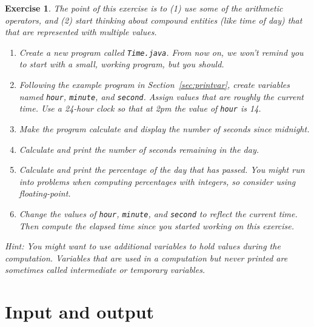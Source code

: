 \documentclass[12pt]{book}
\theoremstyle{exercise}
\newtheorem{exercise}{Exercise}[chapter]
\newcommand{\java}[1]{\verb"#1"}
\newcommand{\java}[1]{\lstinline{#1}} %
\begin{document}
\begin{exercise}

The point of this exercise is to (1) use some of the arithmetic operators, and (2) start thinking about compound entities (like time of day) that that are represented with multiple values.

\begin{enumerate}

\item Create a new program called {\tt Time.java}.
From now on, we won't remind you to start with a small, working program, but you should.

\item Following the example program in Section~\ref{sec:printvar}, create variables named \java{hour}, \java{minute}, and \java{second}.
Assign values that are roughly the current time.
Use a 24-hour clock so that at 2pm the value of \java{hour} is 14.

\item Make the program calculate and display the number of seconds since midnight.

\item Calculate and print the number of seconds remaining in the day.

\item Calculate and print the percentage of the day that has passed.
You might run into problems when computing percentages with integers, so consider using floating-point.

\item Change the values of \java{hour}, \java{minute}, and \java{second} to reflect the current time.
Then compute the elapsed time since you started working on this exercise.

\end{enumerate}

Hint: You might want to use additional variables to hold values during the computation.
Variables that are used in a computation but never printed are sometimes called intermediate or {\em temporary} variables.

\end{exercise}


\chapter{Input and output}

\end{document}
